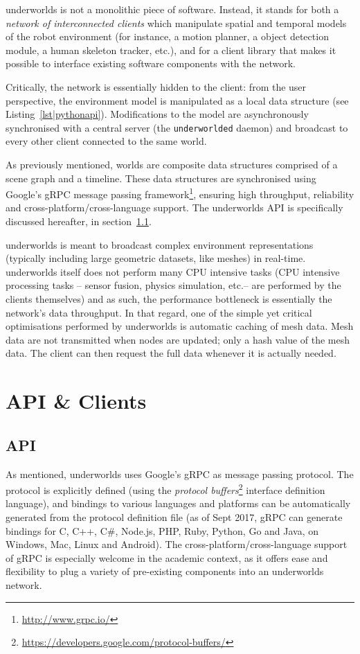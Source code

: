 \documentclass[conference]{IEEEtran}
\newcommand{\etc}{etc.\xspace}
\newcommand{\uwds}{{\sc underworlds}\xspace}
\begin{document}
\uwds is not a monolithic piece of software. Instead, it stands for both a
\emph{network of interconnected clients} which manipulate spatial and temporal
models of the robot environment (for instance, a motion planner, a object
detection module, a human skeleton tracker, etc.), and for a {client library}
that makes it possible to interface existing software components with the network.

Critically, the network is essentially hidden to the client: from the user
perspective, the environment model is manipulated as a local data structure (see
Listing~\ref{lst|pythonapi}). Modifications to the model are asynchronously synchronised with
a central server (the {\tt underworlded} daemon) and broadcast to every other
client connected to the same world.

As previously mentioned, worlds are composite data structures comprised of a
scene graph and a timeline. These data structures are synchronised using
Google's gRPC message passing framework\footnote{\url{http://www.grpc.io/}}, ensuring
high throughput, reliability and cross-platform/cross-language support. The \uwds
API is specifically discussed hereafter, in section~\ref{api}.


\uwds is meant to broadcast complex environment representations (typically
including large geometric datasets, like meshes) in real-time. \uwds itself does
not perform many CPU intensive tasks (CPU intensive processing tasks -- sensor
fusion, physics simulation, \etc -- are performed by the clients themselves) and
as such, the performance bottleneck is essentially the network's data
throughput.  In that regard, one of the simple yet critical optimisations
performed by \uwds is automatic caching of mesh data. Mesh data are not
transmitted when nodes are updated; only a hash value of the mesh data. The
client can then request the full data whenever it is actually needed.



\section{API \& Clients}

\subsection{API}
\label{api}

As mentioned, \uwds uses Google's gRPC as message passing protocol. The protocol
is explicitly defined (using the \emph{protocol
buffers}\footnote{\url{https://developers.google.com/protocol-buffers/}}
interface definition language), and bindings to various languages and platforms
can be automatically generated from the protocol definition file (as of Sept
2017, gRPC can generate bindings for C, C++, C\#, Node.js, PHP, Ruby, Python, Go
and Java, on Windows, Mac, Linux and Android).  The cross-platform/cross-language support
of gRPC is especially welcome in the academic context, as it offers ease and
flexibility to plug a variety of pre-existing components into an \uwds network.
\end{document}
